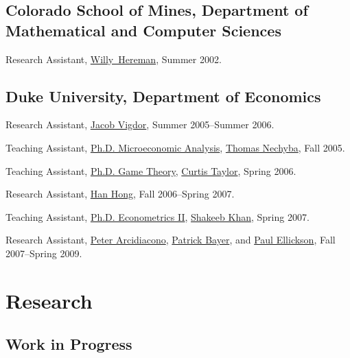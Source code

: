 \documentclass[letterpaper]{article}
\renewenvironment{itemize}{
  \begin{list}{}{
    \setlength{\leftmargin}{1em}
  }
}{
  \end{list}
}
\begin{document}
\subsection*{Colorado School of Mines,
  Department of Mathematical and Computer Sciences}

\begin{itemize}
\item Research Assistant,
  \href{http://www.mines.edu/fs_home/whereman/}{Willy\ Hereman},
  Summer 2002.
\end{itemize}

\subsection*{Duke University, Department of Economics}

\begin{itemize}
\item Research Assistant,
  \href{http://trinity.aas.duke.edu/~jvigdor/}{Jacob Vigdor},
  Summer 2005--Summer 2006.
\item Teaching Assistant,
  \href{http://jblevins.org/courses/econ301f05}{Ph.D. Microeconomic Analysis},
  \href{http://www.econ.duke.edu/~nechyba/}{Thomas Nechyba},
  Fall 2005.
\item Teaching Assistant,
  \href{http://jblevins.org/courses/econ302s06}{Ph.D. Game Theory},
  \href{http://www.duke.edu/~crtaylor/}{Curtis Taylor},
  Spring 2006.
\item Research Assistant,
  \href{http://www.stanford.edu/~doubleh/}{Han Hong},
  Fall 2006--Spring 2007.
\item Teaching Assistant,
  \href{http://jblevins.org/courses/econ342s07}{Ph.D. Econometrics II},
  \href{http://www.econ.duke.edu/~shakeebk/}{Shakeeb Khan},
  Spring 2007.
\item Research Assistant,
  \href{http://www.econ.duke.edu/~psarcidi/}{Peter Arcidiacono},
  \href{http://www.econ.duke.edu/~pb29/}{Patrick Bayer}, and
  \href{http://www.econ.duke.edu/~paule/}{Paul Ellickson},
  Fall 2007--Spring 2009.
\end{itemize}


\section*{Research}

\subsection*{Work in Progress}
\end{document}

